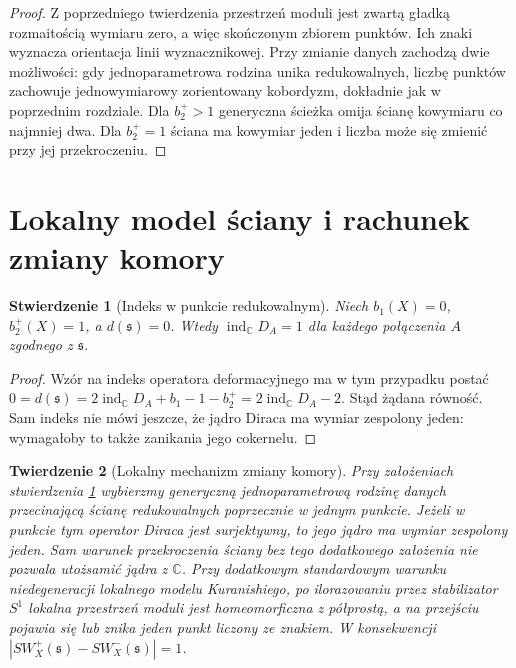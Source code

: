 \documentclass[11pt,a4paper]{report}
\numberwithin{equation}{section}
\theoremstyle{plain}
\newtheorem{twierdzenie}{Twierdzenie}[section]
\newtheorem{stwierdzenie}[twierdzenie]{Stwierdzenie}
\theoremstyle{definition}
\theoremstyle{remark}
\begin{document}
\begin{proof}
Z poprzedniego twierdzenia przestrzeń moduli jest
zwartą gładką rozmaitością wymiaru zero, a więc
skończonym zbiorem punktów. Ich znaki wyznacza
orientacja linii wyznacznikowej. Przy zmianie danych
zachodzą dwie możliwości: gdy jednoparametrowa rodzina
unika redukowalnych, liczbę punktów zachowuje
jednowymiarowy zorientowany kobordyzm, dokładnie jak
w poprzednim rozdziale. Dla $b_2^+>1$ generyczna
ścieżka omija ścianę kowymiaru co najmniej dwa.
Dla $b_2^+=1$ ściana ma kowymiar jeden i
liczba może się zmienić przy jej przekroczeniu.
\end{proof}

\section{Lokalny model ściany i rachunek zmiany komory}
\label{sec:tg-sw12-wall}

\begin{stwierdzenie}[Indeks w punkcie redukowalnym]
\label{prop:tg-sw12-wall-index}
Niech $b_1(X)=0$, $b_2^+(X)=1$, a
$d(\mathfrak s)=0$. Wtedy
$\operatorname{ind}_\mathbb C D_A=1$
dla każdego połączenia $A$ zgodnego z $\mathfrak s$.
\end{stwierdzenie}

\begin{proof}
Wzór na indeks operatora deformacyjnego ma w tym
przypadku postać
$0=d(\mathfrak s)=2\operatorname{ind}_\mathbb C D_A
+b_1-1-b_2^+=2\operatorname{ind}_\mathbb C D_A-2$.
Stąd żądana równość. Sam indeks nie mówi jeszcze,
że jądro Diraca ma wymiar zespolony jeden: wymagałoby
to także zanikania jego cokernelu.
\end{proof}

\begin{twierdzenie}[Lokalny mechanizm zmiany komory]
\label{thm:tg-sw12-wall-model}
Przy założeniach stwierdzenia
\ref{prop:tg-sw12-wall-index} wybierzmy generyczną
jednoparametrową rodzinę danych przecinającą ścianę
redukowalnych poprzecznie w jednym punkcie. Jeżeli
w punkcie tym operator Diraca jest surjektywny, to
jego jądro ma wymiar zespolony jeden. Sam warunek
przekroczenia ściany bez tego dodatkowego założenia
nie pozwala utożsamić jądra z $\mathbb C$. Przy dodatkowym
standardowym warunku niedegeneracji lokalnego modelu
Kuranishiego, po ilorazowaniu przez stabilizator $S^1$
lokalna przestrzeń moduli jest homeomorficzna z półprostą,
a na przejściu pojawia się lub znika jeden punkt
liczony ze znakiem. W konsekwencji
$|SW_X^+(\mathfrak s)-SW_X^-(\mathfrak s)|=1$.
\end{twierdzenie}
\end{document}
